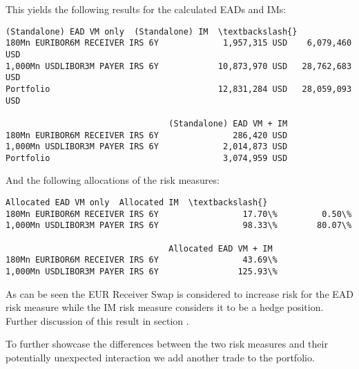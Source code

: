     This yields the following results for the calculated EADs and IMs:

            \begin{tcolorbox}[breakable, size=fbox, boxrule=.5pt, pad at break*=1mm, opacityfill=0]
\begin{Verbatim}[commandchars=\\\{\}]
                                 (Standalone) EAD VM only  (Standalone) IM  \textbackslash{}
180Mn EURIBOR6M RECEIVER IRS 6Y             1,957,315 USD    6,079,460 USD
1,000Mn USDLIBOR3M PAYER IRS 6Y            10,873,970 USD   28,762,683 USD
Portfolio                                  12,831,284 USD   28,059,093 USD

                                 (Standalone) EAD VM + IM
180Mn EURIBOR6M RECEIVER IRS 6Y               286,420 USD
1,000Mn USDLIBOR3M PAYER IRS 6Y             2,014,873 USD
Portfolio                                   3,074,959 USD
\end{Verbatim}
\end{tcolorbox}
        
    And the following allocations of the risk measures:

            \begin{tcolorbox}[breakable, size=fbox, boxrule=.5pt, pad at break*=1mm, opacityfill=0]
\begin{Verbatim}[commandchars=\\\{\}]
                                 Allocated EAD VM only  Allocated IM  \textbackslash{}
180Mn EURIBOR6M RECEIVER IRS 6Y                 17.70\%         0.50\%
1,000Mn USDLIBOR3M PAYER IRS 6Y                 98.33\%        80.07\%

                                 Allocated EAD VM + IM
180Mn EURIBOR6M RECEIVER IRS 6Y                 43.69\%
1,000Mn USDLIBOR3M PAYER IRS 6Y                125.93\%
\end{Verbatim}
\end{tcolorbox}
        
    As can be seen the EUR Receiver Swap is considered to increase risk for
the EAD risk measure while the IM risk measure considers it to be a
hedge position. Further discussion of this result in section
.

    To further showcase the differences between the two risk measures and
their potentially unexpected interaction we add another trade to the
portfolio.

